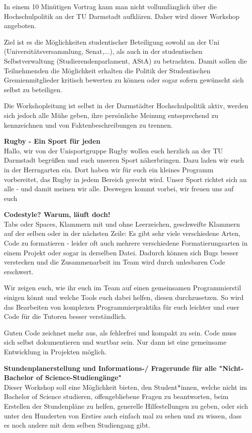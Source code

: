 {    In einem 10 Minütigen Vortrag kann man nicht vollumfänglich
    über die Hochschulpolitik an der TU Darmstadt aufklären.
    Daher wird dieser Workshop angeboten.

    Ziel ist es die Möglichkeiten studentischer Beteiligung
    sowohl an der Uni (Universitätsversammlung, Senat,...),
    als auch in der studentischen Selbstverwaltung
    (Studierendenparlament, AStA) zu betrachten.
    Damit sollen die Teilnehmenden die Möglichkeit erhalten
    die Politik der Studentischen Gremienmitglieder kritisch
    bewerten zu können oder sogar sofern gewünscht sich
    selbst zu beteiligen.

    Die Workshopleitung ist selbst in der Darmstädter Hochschulpolitik
    aktiv, werden sich jedoch alle Mühe geben, ihre persönliche Meinung
    entssprechend zu kennzeichnen und von Faktenbeschreibungen zu
    trennen.

    \textbf{Rugby - Ein Sport für jeden}\\
    Hallo, wir von der Unisportgruppe Rugby wollen euch herzlich an der TU Darmstadt begrüßen und euch unseren Sport näherbringen.
    Dazu laden wir euch in der Herrngarten ein. Dort haben wir für euch ein kleines Programm vorbereitet, das Rugby in jedem Bereich gerecht wird. Unser Sport richtet sich an alle - und damit meinen wir alle. Deswegen kommt vorbei, wir freuen uns auf euch

    \textbf{Codestyle? Warum, läuft doch!}\\
    Tabs oder Spaces, Klammern mit und ohne Leerzeichen, geschweifte Klammern auf der selben oder in der nächsten Zeile: Es gibt sehr viele verschiedene Arten, Code zu formatieren - leider oft auch mehrere verschiedene Formatierungsarten in einem Projekt oder sogar in derselben Datei. Dadurch können sich Bugs besser verstecken und die Zusammenarbeit im Team wird durch unlesbaren Code erschwert.

    Wir zeigen euch, wie ihr euch im Team auf einen gemeinsamen Programmierstil einigen könnt und welche Tools euch dabei helfen, diesen durchzusetzen. So wird das Bearbeiten von komplexen Programmierpraktika für euch leichter und euer Code für die Tutoren besser verständlich.

    Guten Code zeichnet mehr aus, als fehlerfrei und kompakt zu sein. Code muss sich selbst dokumentieren und wartbar sein. Nur dann ist eine gemeinsame Entwicklung in Projekten möglich.

    \textbf{Stundenplanerstellung und Informations-/ Fragerunde für alle "Nicht-Bachelor of Science-Studiengänge"}\\
    Dieser Workshop soll eine Möglichkeit bieten, den Student*innen, welche nicht im Bachelor of Science studieren, offengebliebene Fragen zu beantworten, beim Erstellen der Stundenpläne zu helfen, generelle Hilfestellungen zu geben, oder sich unter den Hunderten von Ersties auch einfach mal zu sehen und zu wissen, dass es noch andere mit dem selben Studiengang gibt.
}{}
